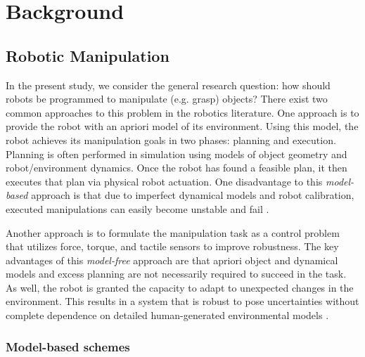 \chapter{Background}
\label{chap2}

\section{Robotic Manipulation}

In the present study, we consider the general research question: how should robots be programmed to manipulate (e.g. grasp) objects? 
There exist two common approaches to this problem in the robotics literature.
One approach is to provide the robot with an apriori model of its environment. 
Using this model, the robot achieves its manipulation goals in two phases: planning and execution.
Planning is often performed in simulation using models of object geometry and robot/environment dynamics.
Once the robot has found a feasible plan, it then executes that plan via physical robot actuation.
One disadvantage to this \emph{model-based} approach is that due to imperfect dynamical models and robot calibration, executed manipulations can easily become unstable and fail \cite{dang2012tactile}.

Another approach is to formulate the manipulation task as a control problem that utilizes force, torque, and tactile sensors to improve robustness.
The key advantages of this \emph{model-free} approach are that apriori object and dynamical models and excess planning are not necessarily required to succeed in the task.
As well, the robot is granted the capacity to adapt to unexpected changes in the environment.
This results in a system that is robust to pose uncertainties without complete dependence on detailed human-generated environmental models \cite{dang2012tactile}.


\subsection{Model-based schemes}

